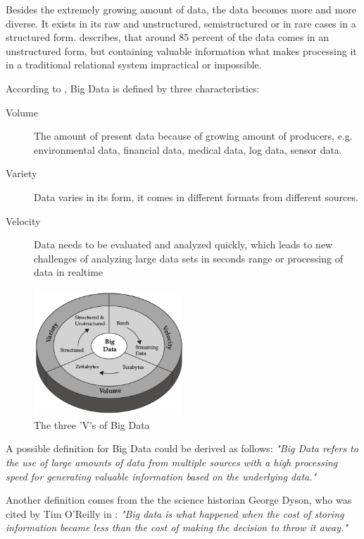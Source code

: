 Besides the extremely growing amount of data, the data becomes more and more diverse.
It exists in its raw and unstructured, semistructured or in rare cases in a structured form.
\cite{Bitk12} describes, that around 85 percent of the data comes in an unstructured
form, but containing valuable information what makes processing it in a traditional
relational system impractical or impossible.

According to \cite{Marz15} \cite{Ziko12}, Big Data is defined by three characteristics:
\begin{description}
    \item [Volume] The amount of present data because of growing amount of producers,
    e.g. environmental data, financial data, medical data, log data, sensor data.
    \item [Variety] Data varies in its form, it comes in different formats from different sources.
    \item [Velocity] Data needs to be evaluated and analyzed quickly, which leads to new challenges
    of analyzing large data sets in seconds range or processing of data in realtime
\end{description}
\begin{figure}[H]
	\centering
	\includegraphics[width=0.5\textwidth]{../images/03-three-vs-of-bigdata.png}
	\caption{The three 'V's of Big Data{\cite{Ziko12}}}
	\label{three-vs-of-bigdata}
\end{figure}

A possible definition for Big Data could be derived as follows: \textit{"Big Data refers to the use
of large amounts of data from multiple sources with a high processing speed for generating
valuable information based on the underlying data."}

Another definition comes from the the science historian George Dyson, who was cited by
Tim O'Reilly in \cite{Dys13}:
\textit{"Big data is what happened when the cost of storing information became less than the
cost of making the decision to throw it away."}

